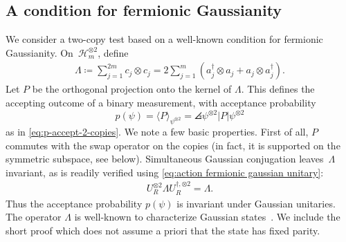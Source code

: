 \documentclass[11pt,a4paper]{article}
\numberwithin{equation}{section}
\newcommand{\ot}{\otimes}
\newcommand{\HH}{\mathcal{H}}
\newcommand{\1}{\mathbf{1}}
\DeclarePairedDelimiter\angles{\langle}{\rangle}
\begin{document}
\subsection{A condition for fermionic Gaussianity}
We consider a two-copy test based on a well-known condition for fermionic Gaussianity.
On~$\HH_m^{\ot 2}$, define
\begin{align*}
    \Lambda
    \coloneqq\sum_{j=1}^{2m}c_j\ot c_j = 2\sum_{j=1}^m (a_j^\dagger \ot a_j + a_j \ot a_j^\dagger).
\end{align*}
Let $P$ be the orthogonal projection onto the kernel of $\Lambda$.
This defines the accepting outcome of a binary measurement, with acceptance probability
\[ p(\psi) = \langle P \rangle_{\psi^{\ot 2}} = \angles{\psi^{\ot 2} | P | \psi^{\ot 2}} \]
as in \cref{eq:p-accept-2-copies}.
We note a few basic properties.
First of all, $P$ commutes with the swap operator on the copies (in fact, it is supported on the symmetric subspace, see below).
Simultaneous Gaussian conjugation leaves~$\Lambda$ invariant, as is readily verified using \cref{eq:action fermionic gaussian unitary}:
\begin{align}\label{eq:Lambda-Gaussian-invariance}
    U_R^{\ot 2}  \Lambda  U_R^{\dagger, \ot 2} = \Lambda.
\end{align}
Thus the acceptance probability $p(\psi)$ is invariant under Gaussian unitaries.
The operator $\Lambda$ is well-known to characterize Gaussian states~\cite{bravyi2005lagrangian,melo2013power}.
We include the short proof which does not assume a priori that the state has fixed parity.
\end{document}

